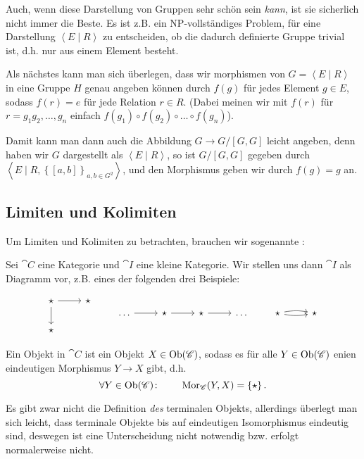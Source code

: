 \begin{remark*}
\Warning    Auch, wenn diese Darstellung von Gruppen sehr schön sein \textit{kann}, ist sie sicherlich nicht immer die Beste. Es ist z.B. ein NP-vollständiges Problem, für eine Darstellung $\left< E \mid  R \right> $ zu entscheiden, ob die dadurch definierte Gruppe trivial ist, d.h. nur aus einem Element besteht.
\end{remark*}
\begin{recap}
    Als nächstes kann man sich überlegen, dass wir morphismen von $G = \left< E \mid  R \right> $ in eine Gruppe $H$ genau angeben können durch  $f(g)$ für jedes Element  $g\in E$, sodass $f(r) = e$ für jede Relation  $r\in R$. (Dabei meinen wir mit $f(r)$ für  $r = g_1g_2,\ldots,g_n$ einfach $f(g_1)\circ f(g_2)\circ \ldots\circ f(g_n)$). 

    Damit kann man dann auch die Abbildung $G \to  G / [G,G]$ leicht angeben, denn haben wir $G$ dargestellt als  $\left< E \mid  R \right> $, so ist $G / [G,G]$ gegeben durch  $\left< E \mid R, \left \{[a,b]\right\} _{a,b\in G^2} \right> $, und den Morphismus geben wir durch $f(g) = g$ an.
\end{recap}

\subsection{Limiten und Kolimiten}
Um Limiten und Kolimiten zu betrachten, brauchen wir sogenannte :

Sei $\cat{C}$ eine Kategorie und $\cat{I}$ eine kleine Kategorie. Wir stellen uns dann $\cat{I}$ als Diagramm vor, z.B. eines der folgenden drei Beispiele:

\begin{equation}
\begin{tikzcd}
    \star \ar{r} \ar{d} & \star \\
    \star
\end{tikzcd} 
\qquad
\begin{tikzcd}
    \ldots \ar{r} & \star \ar{r} & \star \ar{r} &\ldots
\end{tikzcd}
\qquad
\begin{tikzcd}
    \star \ar[bend left = 10]{r} \ar[bend right = 10]{r} & \star
\end{tikzcd}
\label{eq:diagramme}
\end{equation}

\begin{definition}
    Ein  Objekt in $\cat{C}$ ist ein Objekt $X\in \operatorname{Ob}(\mathscr{C})$, sodass es für alle $Y\in \operatorname{Ob}(\mathscr{C})$ enien eindeutigen Morphismus $Y \to  X$ gibt, d.h.
     \[
         \forall Y\in \operatorname{Ob}(\mathscr{C})\colon  \qquad \operatorname{Mor}_{\mathscr{C}}(Y,X) = \left \{\star\right\} 
    .\] 
\end{definition}
\begin{oral}
    Es gibt zwar nicht die Definition \textit{des} terminalen Objekts, allerdings überlegt man sich leicht, dass terminale Objekte bis auf eindeutigen Isomorphismus eindeutig sind, deswegen ist eine Unterscheidung nicht notwendig bzw. erfolgt normalerweise nicht.
\end{oral}

